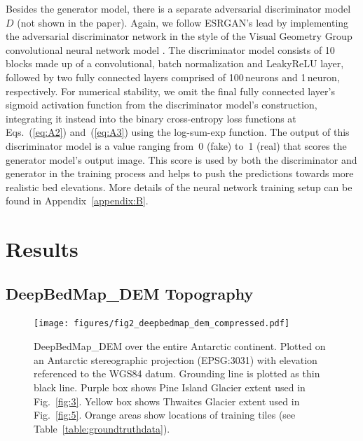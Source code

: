 \documentclass[tc, noline]{copernicus}
\begin{document}
Besides the generator model, there is a separate adversarial discriminator model $D$ (not shown in the paper).
Again, we follow ESRGAN's \citep{WangESRGANEnhancedSuperResolution2019} lead by implementing the adversarial discriminator network in the style of the Visual Geometry Group convolutional neural network model \citep[VGG;][]{SimonyanVeryDeepConvolutional2014}.
The discriminator model consists of 10 blocks made up of a convolutional, batch normalization \citep{IoffeBatchNormalizationAccelerating2015} and LeakyReLU \citep{MaasRectifiernonlinearitiesimprove2013} layer, followed by two fully connected layers comprised of 100\,\unit{neurons} and 1\,\unit{neuron}, respectively.
For numerical stability, we omit the final fully connected layer's sigmoid activation function from the discriminator model's construction, integrating it instead into the binary cross-entropy loss functions at Eqs.~(\ref{eq:A2}) and~(\ref{eq:A3}) using the log-sum-exp function.
The output of this discriminator model is a value ranging from~0 (fake) to~1 (real) that scores the generator model's output image.
This score is used by both the discriminator and generator in the training process and helps to push the predictions towards more realistic bed elevations.
More details of the neural network training setup can be found in Appendix~\ref{appendix:B}.


\section{Results}

\subsection{DeepBedMap\_DEM Topography} \label{section:deepbedmapdemtopography}

\begin{figure}[t]
    \texttt{[image: figures/fig2\_deepbedmap\_dem\_compressed.pdf]}
    \caption{
      DeepBedMap\_DEM over the entire Antarctic continent.
      Plotted on an Antarctic stereographic projection (EPSG:3031) with elevation referenced to the WGS84 datum.
      Grounding line is plotted as thin black line.
      Purple box shows Pine Island Glacier extent used in Fig.~\ref{fig:3}.
      Yellow box shows Thwaites Glacier extent used in Fig.~\ref{fig:5}.
      Orange areas show locations of training tiles (see Table~\ref{table:groundtruthdata}).
    }
    \label{fig:2}
\end{figure}
\end{document}
